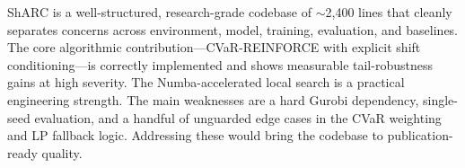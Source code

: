 \documentclass[11pt,a4paper]{article}
\begin{document}
ShARC is a well-structured, research-grade codebase of $\sim$2,400 lines that
cleanly separates concerns across environment, model, training, evaluation, and
baselines. The core algorithmic contribution---CVaR-REINFORCE with explicit
shift conditioning---is correctly implemented and shows measurable tail-robustness
gains at high severity. The Numba-accelerated local search is a practical
engineering strength. The main weaknesses are a hard Gurobi dependency, single-seed
evaluation, and a handful of unguarded edge cases in the CVaR weighting and LP
fallback logic. Addressing these would bring the codebase to publication-ready
quality.
\end{document}
